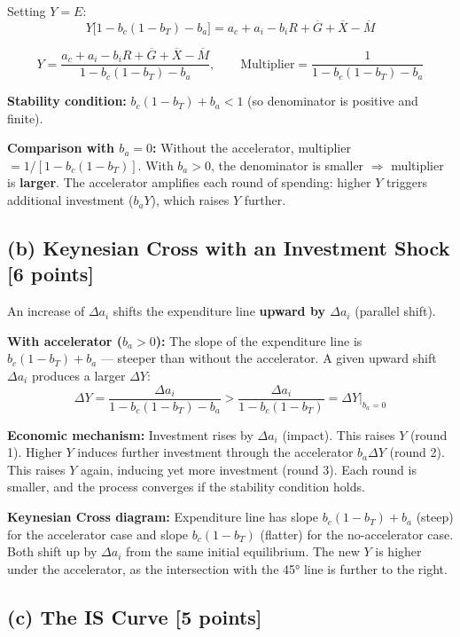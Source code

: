 \documentclass[letterpaper,12pt]{article}
\begin{document}
Setting $Y = E$:
\[
Y\bigl[1 - b_c(1-b_T) - b_a\bigr] = a_c + a_i - b_i R + \overline{G} + \overline{X} - \overline{M}
\]

\textcolor{sol}{
\[
Y = \frac{a_c + a_i - b_i R + \overline{G} + \overline{X} - \overline{M}}{1 - b_c(1-b_T) - b_a}, \qquad \text{Multiplier} = \frac{1}{1-b_c(1-b_T)-b_a}
\]
}

\textbf{Stability condition:} $b_c(1-b_T) + b_a < 1$ (so denominator is positive and finite).

\textbf{Comparison with $b_a = 0$:} Without the accelerator, multiplier $= 1/[1-b_c(1-b_T)]$. With $b_a > 0$, the denominator is smaller $\Rightarrow$ multiplier is \textbf{larger}. The accelerator amplifies each round of spending: higher $Y$ triggers additional investment ($b_a Y$), which raises $Y$ further.

\subsection*{(b) Keynesian Cross with an Investment Shock [6 points]}

An increase of $\Delta a_i$ shifts the expenditure line \textbf{upward by $\Delta a_i$} (parallel shift).

\textbf{With accelerator ($b_a > 0$):} The slope of the expenditure line is $b_c(1-b_T) + b_a$ — steeper than without the accelerator. A given upward shift $\Delta a_i$ produces a larger $\Delta Y$:
\[
\Delta Y = \frac{\Delta a_i}{1-b_c(1-b_T)-b_a} > \frac{\Delta a_i}{1-b_c(1-b_T)} = \Delta Y\big|_{b_a=0}
\]

\textbf{Economic mechanism:} Investment rises by $\Delta a_i$ (impact). This raises $Y$ (round 1). Higher $Y$ induces further investment through the accelerator $b_a \Delta Y$ (round 2). This raises $Y$ again, inducing yet more investment (round 3). Each round is smaller, and the process converges if the stability condition holds.

\textbf{Keynesian Cross diagram:} Expenditure line has slope $b_c(1-b_T)+b_a$ (steep) for the accelerator case and slope $b_c(1-b_T)$ (flatter) for the no-accelerator case. Both shift up by $\Delta a_i$ from the same initial equilibrium. The new $Y$ is higher under the accelerator, as the intersection with the 45° line is further to the right.

\subsection*{(c) The IS Curve [5 points]}
\end{document}
